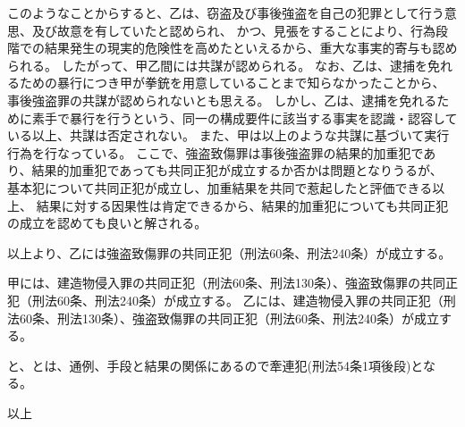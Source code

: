 \documentclass[11pt]{jsarticle}
\begin{document}
				このようなことからすると、乙は、窃盗及び事後強盗を自己の犯罪として行う意思、及び故意を有していたと認められ、
				かつ、見張をすることにより、行為段階での結果発生の現実的危険性を高めたといえるから、重大な事実的寄与も認められる。
				したがって、甲乙間には共謀が認められる。
				なお、乙は、逮捕を免れるための暴行につき甲が拳銃を用意していることまで知らなかったことから、
				事後強盗罪の共謀が認められないとも思える。
				しかし、乙は、逮捕を免れるために素手で暴行を行うという、同一の構成要件に該当する事実を認識・認容している以上、共謀は否定されない。
			\sectionD{}
				また、甲は以上のような共謀に基づいて実行行為を行なっている。
		\sectionC{}
			ここで、強盗致傷罪は事後強盗罪の結果的加重犯であり、結果的加重犯であっても共同正犯が成立するか否かは問題となりうるが、
			基本犯について共同正犯が成立し、加重結果を共同で惹起したと評価できる以上、
			結果に対する因果性は肯定できるから、結果的加重犯についても共同正犯の成立を認めても良いと解される。
		
			以上より、乙には強盗致傷罪の共同正犯（刑法60条、刑法240条）が成立する。
		
		
		
		
	甲には、建造物侵入罪の共同正犯（刑法60条、刑法130条）、強盗致傷罪の共同正犯（刑法60条、刑法240条）が成立する。
	乙には、建造物侵入罪の共同正犯（刑法60条、刑法130条）、強盗致傷罪の共同正犯（刑法60条、刑法240条）が成立する。
	
	と、とは、通例、手段と結果の関係にあるので牽連犯(刑法54条1項後段)となる。

\begin{flushright}
	以上
\end{flushright}
		
		
\end{document}
